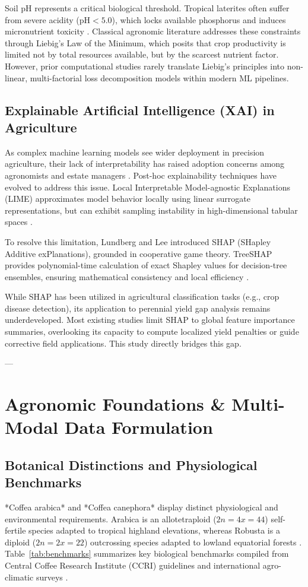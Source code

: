 \documentclass[conference]{IEEEtran}
\begin{document}
Soil pH represents a critical biological threshold. Tropical laterites often suffer from severe acidity ($\text{pH} < 5.0$), which locks available phosphorus and induces micronutrient toxicity \cite{martins2021}. Classical agronomic literature addresses these constraints through Liebig's Law of the Minimum, which posits that crop productivity is limited not by total resources available, but by the scarcest nutrient factor. However, prior computational studies rarely translate Liebig's principles into non-linear, multi-factorial loss decomposition models within modern ML pipelines.

\subsection{Explainable Artificial Intelligence (XAI) in Agriculture}
As complex machine learning models see wider deployment in precision agriculture, their lack of interpretability has raised adoption concerns among agronomists and estate managers \cite{holzinger2022}. Post-hoc explainability techniques have evolved to address this issue. Local Interpretable Model-agnostic Explanations (LIME) approximates model behavior locally using linear surrogate representations, but can exhibit sampling instability in high-dimensional tabular spaces \cite{lundberg2017}. 

To resolve this limitation, Lundberg and Lee \cite{lundberg2017} introduced SHAP (SHapley Additive exPlanations), grounded in cooperative game theory. TreeSHAP provides polynomial-time calculation of exact Shapley values for decision-tree ensembles, ensuring mathematical consistency and local efficiency \cite{lundberg2020}. 

While SHAP has been utilized in agricultural classification tasks (e.g., crop disease detection), its application to perennial yield gap analysis remains underdeveloped. Most existing studies limit SHAP to global feature importance summaries, overlooking its capacity to compute localized yield penalties or guide corrective field applications. This study directly bridges this gap.

---

\section{Agronomic Foundations \& Multi-Modal Data Formulation}

\subsection{Botanical Distinctions and Physiological Benchmarks}
*Coffea arabica* and *Coffea canephora* display distinct physiological and environmental requirements. Arabica is an allotetraploid ($2n = 4x = 44$) self-fertile species adapted to tropical highland elevations, whereas Robusta is a diploid ($2n = 2x = 22$) outcrossing species adapted to lowland equatorial forests \cite{davis2019}. Table~\ref{tab:benchmarks} summarizes key biological benchmarks compiled from Central Coffee Research Institute (CCRI) guidelines \cite{coffeeboard2022} and international agro-climatic surveys \cite{fao2018}.
\end{document}

